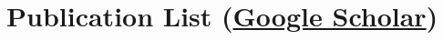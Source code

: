\documentclass[letterpaper,10.8pt]{article}
\newcommand{\resumeSubHeadingListEnd}{\end{itemize}}
\begin{document}

\section{Publication List (\href{https://scholar.google.com/citations?hl=en&user=qx0FzMAAAAAJ&view_op=list_works&authuser=1&sortby=pubdate}{Google Scholar})}
\end{document}
